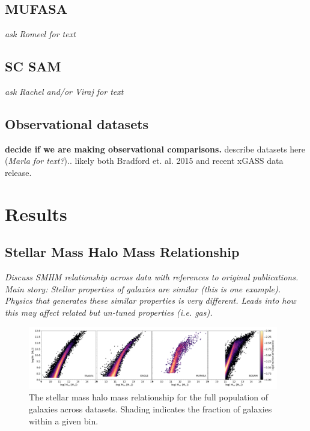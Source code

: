 \documentclass[fleqn,usenatbib]{mnras}
\begin{document}
\subsection{MUFASA}
\label{sec:MUFASA method}
{\it ask Romeel for text}

\subsection{SC SAM}
\label{sec:SC-SAM method}
{\it ask Rachel and/or Viraj for text}

\subsection{Observational datasets}
\label{sec:observational data}
{\bf decide if we are making observational comparisons.} describe datasets here ({\it Marla for text?}).. likely both Bradford et. al. 2015 and recent xGASS data release.

\section{Results}
\label{sec:results}

\subsection{Stellar Mass Halo Mass Relationship}
\label{sec:results:SMHM}
{\it Discuss SMHM relationship across data with references to original publications. Main story: Stellar properties of galaxies are similar (this is one example). Physics that generates these similar properties is very different. Leads into how this may affect related but un-tuned properties (i.e. gas).}

\begin{figure}
\includegraphics[width = 0.975\textwidth]{halo_stellar_2D_fraction.png}
\caption{The stellar mass halo mass relationship for the full population of galaxies across datasets. Shading indicates the fraction of galaxies within a given bin.}
\label{fig:fgas mstar 2D}
\end{figure}
\end{document}
